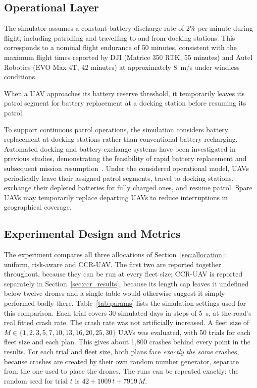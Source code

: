 \documentclass[11pt]{article}
\begin{document}
\subsection{Operational Layer}

The simulator assumes a constant battery discharge rate of 2\% per minute during flight, including patrolling and travelling to and from docking stations. This corresponds to a nominal flight endurance of 50 minutes, consistent with the maximum flight times reported by DJI (Matrice 350 RTK, 55 minutes) and Autel Robotics (EVO Max 4T, 42 minutes) at approximately 8~m/s under
windless conditions.

When a UAV approaches its battery reserve threshold, it temporarily leaves its patrol segment for battery replacement at a docking station before resuming its patrol.

To support continuous patrol operations, the simulation considers
battery replacement at docking stations rather than conventional
battery recharging. Automated docking and battery exchange systems have been investigated in previous studies, demonstrating the feasibility of rapid battery replacement and subsequent mission resumption~\cite{blaha2023droneport,vilkki2024battery}.
Under the considered operational model, UAVs periodically leave
their assigned patrol segments, travel to docking stations, exchange their depleted batteries for fully charged ones, and resume patrol.
Spare UAVs may temporarily replace departing UAVs to reduce
interruptions in geographical coverage.

\subsection{Experimental Design and Metrics}
The experiment compares all three allocations of
Section~\ref{sec:allocation}: uniform,
risk-aware and CCR-UAV. The first two are reported together throughout,
because they can be run at every fleet size; CCR-UAV is reported separately
in Section~\ref{sec:ccr_results}, because its length cap leaves it undefined
below twelve drones and a single table would otherwise suggest it simply
performed badly there.
Table~\ref{tab:params} lists the simulation settings used for this comparison.  Each trial covers 30
simulated days in steps of 5~s, at the road's real fitted crash rate. The crash rate was not artificially increased. A fleet size of $M\in\{1,2,3,5,7,10,13,16,20,25,30\}$ UAVs was evaluated, with 50 trials for each fleet size and each plan. This gives about 1{,}800 crashes behind every point in the
results. For each trial and fleet size, both plans face \emph{exactly the same} crashes, because crashes are created by their own random number generator, separate from the one used to place the drones. The runs can be repeated exactly: the random seed for trial $t$ is $42+1009\,t+7919\,M$.
\end{document}

